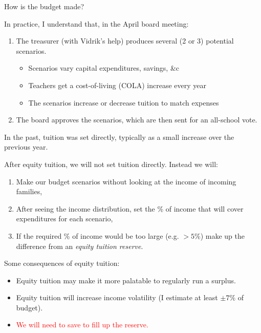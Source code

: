\documentclass[8pt]{beamer}
\begin{document}
\begin{frame}{How is the budget made?}

%

In practice, I understand that, in the April board meeting:
%
\begin{enumerate}
%
\item The treasurer (with Vidrik's help) produces several
    (2 or 3) potential scenarios.
\begin{itemize}
    \item Scenarios vary capital expenditures, savings, \&c
    \item Teachers get a cost-of-living (COLA) increase every year
    \item The scenarios increase or decrease tuition to match expenses
\end{itemize}
\item The board approves the scenarios, which are then sent for an all-school
vote.
%
\end{enumerate}
%

In the past, tuition was set directly, typically as a small increase over
the previous year.

After equity tuition, we will not set tuition directly.  Instead we will:
%
\begin{enumerate}
%
\item Make our budget scenarios without looking at the income of incoming
families,
\item After seeing the income distribution, set the \% of income that will cover
expenditures for each scenario,
\item If the required \% of income would be too large (e.g. $> 5\%$)
make up the difference from an {\em equity tuition reserve}.
%
\end{enumerate}
%
Some consequences of equity tuition:
%
\begin{itemize}
%
\item Equity tuition may make it more palatable to regularly run a surplus.
\item Equity tuition will increase income volatility
    (I estimate at least $\pm 7\%$ of budget).
\item \textcolor{red}{We will need to save to fill up the reserve.}
%
\end{itemize}
%
\end{frame}
\end{document}
